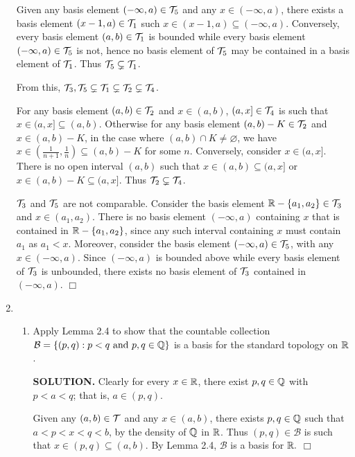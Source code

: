 \documentclass{article}
\begin{document}
\begin{enumerate}
    Given any basis element $(-\infty, a) \in \mathcal{T}_5$ and any $x \in (-\infty, a)$, there exists a basis element $(x-1, a) \in \mathcal{T}_1$ such $x \in (x-1, a) \subseteq (-\infty, a)$. Conversely, every basis element $(a, b) \in \mathcal{T}_1$ is bounded while every basis element $(-\infty, a) \in \mathcal{T}_5$ is not, hence no basis element of $\mathcal{T}_5$ may be contained in a basis element of $\mathcal{T}_1$. Thus $\mathcal{T}_5 \subsetneq \mathcal{T}_1$.

    From this, $\mathcal{T}_3 , \mathcal{T}_5 \subsetneq \mathcal{T}_1 \subsetneq \mathcal{T}_2 \subsetneq \mathcal{T}_4$.
    
    For any basis element $(a, b) \in \mathcal{T}_2$ and $x \in (a, b)$, $(a, x] \in \mathcal{T}_4$ is such that $x \in (a, x] \subseteq (a, b)$. Otherwise for any basis element $(a, b) - K \in \mathcal{T}_2$ and $x \in (a, b) - K$, in the case where $(a, b) \cap K \neq \varnothing$, we have $x \in \left(\frac{1}{n+1}, \frac{1}{n} \right) \subseteq (a, b) - K$ for some $n$. Conversely, consider $x \in (a, x]$. There is no open interval $(a, b)$ such that $x \in (a, b) \subseteq (a, x]$ or $x \in (a,b) - K \subseteq (a, x]$. Thus $\mathcal{T}_2 \subsetneq \mathcal{T}_4$.
        
    $\mathcal{T}_3$ and $\mathcal{T}_5$ are not comparable. Consider the basis element $\mathbb{R} - \{a_1, a_2 \} \in \mathcal{T}_3$ and $x \in (a_1, a_2)$. There is no basis element $(-\infty, a)$ containing $x$ that is contained in $\mathbb{R} - \{a_1, a_2 \}$, since any such interval containing $x$ must contain $a_1$ as $a_1 < x$. Moreover, consider the basis element $(-\infty, a) \in \mathcal{T}_5$, with any $x \in (-\infty, a)$. Since $(-\infty, a)$ is bounded above while every basis element of $\mathcal{T}_3$ is unbounded, there exists no basis element of $\mathcal{T}_3$ contained in $(-\infty, a)$. $\Box$

    \item \begin{enumerate}
        \item Apply Lemma 2.4 to show that the countable collection $\mathcal{B} = \{(p, q) : p<q \text{ and } p, q \in \mathbb{Q}\}$ is a basis for the standard topology on $\mathbb{R}$.

        {\bf SOLUTION.} Clearly for every $x \in \mathbb{R}$, there exist $p, q \in \mathbb{Q}$ with $p < a <q$; that is, $a \in (p, q)$.
        
        Given any $(a, b) \in \mathcal{T}$ and any $x \in (a, b)$, there exists $p, q \in \mathbb{Q}$ such that $a < p< x< q< b$, by the density of $\mathbb{Q}$ in $\mathbb{R}$. Thus $(p, q) \in \mathcal{B}$ is such that $x \in (p, q) \subseteq (a, b)$. By Lemma 2.4, $\mathcal{B}$ is a basis for $\mathbb{R}.$ $\Box$
        

\end{enumerate}
\end{enumerate}
\end{document}
